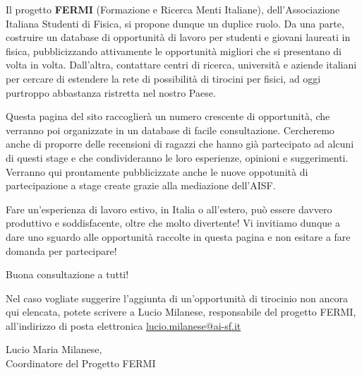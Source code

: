 \documentclass[a4paper,10pt]{article}
\begin{document}
Il progetto \textbf{FERMI} (Formazione e Ricerca Menti Italiane), dell’Associazione Italiana Studenti di Fisica, si propone dunque un duplice ruolo. Da una parte, costruire un database di opportunità di lavoro per studenti e giovani laureati in fisica, pubblicizzando attivamente le opportunità migliori che si presentano di volta in volta. Dall’altra, contattare centri di ricerca, università e aziende italiani per cercare di estendere la rete di possibilità di tirocini per fisici, ad oggi purtroppo abbastanza ristretta nel nostro Paese. \newline

Questa pagina del sito raccoglierà un numero crescente di opportunità, che verranno poi organizzate in un database di facile consultazione. Cercheremo anche di proporre delle recensioni di ragazzi che hanno già partecipato ad alcuni di questi stage e che condivideranno le loro esperienze, opinioni e suggerimenti. Verranno qui prontamente pubblicizzate anche le nuove oppotunità di partecipazione a stage create grazie alla mediazione dell’AISF. \newline

Fare un’esperienza di lavoro estivo, in Italia o all’estero, può essere davvero produttivo e soddisfacente, oltre che molto divertente! Vi invitiamo dunque a dare uno sguardo alle opportunità raccolte in questa pagina e non esitare a fare domanda per partecipare! \newline

Buona consultazione a tutti! \newline

Nel caso vogliate suggerire l’aggiunta di un’opportunità di tirocinio non ancora qui elencata, potete scrivere a Lucio Milanese, responsabile del progetto FERMI, all’indirizzo di posta elettronica \href{mailto:lucio.milanese@ai-sf.it}{lucio.milanese@ai-sf.it} \newline

\begin{flushright}
  Lucio Maria Milanese, \\
Coordinatore del Progetto FERMI
\end{flushright}
\newpage

\tableofcontents

\newpage

\end{document}

